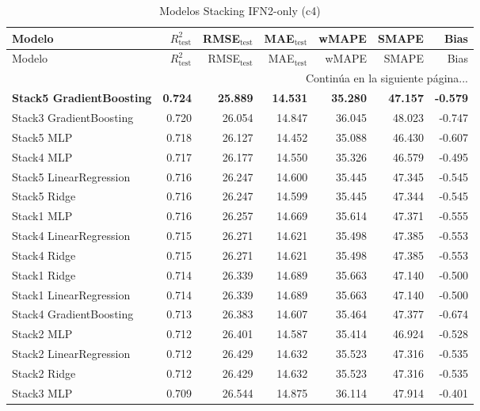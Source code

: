 \begin{longtable}{lrrrrrr}
    \caption{Modelos Stacking IFN2-only (c4)}
    \label{tab:stack_ifn2_c4} \\
    \toprule
    Modelo & $R^2_{\text{test}}$ & RMSE$_{\text{test}}$ & MAE$_{\text{test}}$ & wMAPE & SMAPE & Bias \\
    \midrule
    \endfirsthead
    \toprule
    Modelo & $R^2_{\text{test}}$ & RMSE$_{\text{test}}$ & MAE$_{\text{test}}$ & wMAPE & SMAPE & Bias \\
    \midrule
    \endhead
    \midrule
    \multicolumn{7}{r}{{Continúa en la siguiente página...}} \\
    \endfoot
    \bottomrule
    \endlastfoot
    \textbf{Stack5 GradientBoosting} & \textbf{0.724} & \textbf{25.889} & \textbf{14.531} & \textbf{35.280} & \textbf{47.157} & \textbf{-0.579} \\
    Stack3 GradientBoosting & 0.720 & 26.054 & 14.847 & 36.045 & 48.023 & -0.747 \\
    Stack5 MLP & 0.718 & 26.127 & 14.452 & 35.088 & 46.430 & -0.607 \\
    Stack4 MLP & 0.717 & 26.177 & 14.550 & 35.326 & 46.579 & -0.495 \\
    Stack5 LinearRegression & 0.716 & 26.247 & 14.600 & 35.445 & 47.345 & -0.545 \\
    Stack5 Ridge & 0.716 & 26.247 & 14.599 & 35.445 & 47.344 & -0.545 \\
    Stack1 MLP & 0.716 & 26.257 & 14.669 & 35.614 & 47.371 & -0.555 \\
    Stack4 LinearRegression & 0.715 & 26.271 & 14.621 & 35.498 & 47.385 & -0.553 \\
    Stack4 Ridge & 0.715 & 26.271 & 14.621 & 35.498 & 47.385 & -0.553 \\
    Stack1 Ridge & 0.714 & 26.339 & 14.689 & 35.663 & 47.140 & -0.500 \\
    Stack1 LinearRegression & 0.714 & 26.339 & 14.689 & 35.663 & 47.140 & -0.500 \\
    Stack4 GradientBoosting & 0.713 & 26.383 & 14.607 & 35.464 & 47.377 & -0.674 \\
    Stack2 MLP & 0.712 & 26.401 & 14.587 & 35.414 & 46.924 & -0.528 \\
    Stack2 LinearRegression & 0.712 & 26.429 & 14.632 & 35.523 & 47.316 & -0.535 \\
    Stack2 Ridge & 0.712 & 26.429 & 14.632 & 35.523 & 47.316 & -0.535 \\
    Stack3 MLP & 0.709 & 26.544 & 14.875 & 36.114 & 47.914 & -0.401 \\

\end{longtable}
